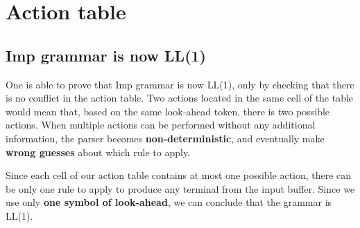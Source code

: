 \section{Action table}


\subsection{Imp grammar is now LL(1)}

One is able to prove that Imp grammar is now LL(1), only by checking that there is no conflict in the action table.
Two actions located in the same cell of the table would mean that, based on the same look-ahead token, 
there is two possible actions. When multiple actions can be performed without any additional information,
the parser becomes \textbf{non-deterministic}, and eventually make \textbf{wrong guesses} about which rule to apply.

Since each cell of our action table contains at most one possible action, there can be only one rule to apply to produce
any terminal from the input buffer. Since we use only \textbf{one symbol of look-ahead}, we can conclude
that the grammar is LL(1).